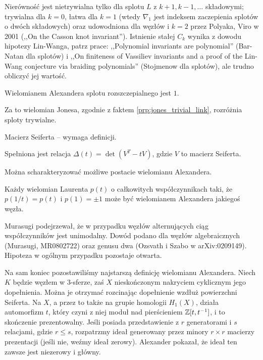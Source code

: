 Nierówność jest nietrywialna tylko dla splotu $L$ z $k+1, k-1, \ldots$ składowymi; trywialna dla $k = 0$, łatwa dla $k=1$ (wtedy $\nabla_1$ jest indeksem zaczepienia splotów o dwóch składowych) oraz udowodniona dla węzłów i $k=2$ przez Polyaka, Viro w 2001 (,,On the Casson knot invariant'').
Istnienie stałej $C_k$ wynika z dowodu hipotezy Lin-Wanga, patrz prace:
,,Polynomial invariants are polynomial'' (Bar-Natan dla splotów) i ,,On finiteness of Vassiliev invariants and a proof of the Lin-Wang conjecture via braiding polynomials'' (Stojmenow dla splotów), ale trudno obliczyć jej wartość.


\begin{proposition}
	Wielomianem Alexandera splotu rozszczepialnego jest $1$.
\end{proposition}

Za to wielomian Jonesa, zgodnie z faktem \ref{prp:jones_trivial_link}, rozróżnia sploty trywialne.

Macierz Seiferta -- wymaga definicji.
\begin{proposition}
	Spełniona jest relacja $\Delta(t)=\det(V^T-tV)$, gdzie $V$ to macierz Seiferta.
\end{proposition}

Można scharakteryzować możliwe postacie wielomianu Alexandera.

\begin{proposition}[Hosokowa, 1958]
	Każdy wielomian Laurenta $p(t)$ o całkowitych współczynnikach taki, że $p(1/t) = p(t)$ i $p(1) = \pm 1$ może być wielomianem Alexandera jakiegoś węzła.
\end{proposition}

Murasugi podejrzewał, że w przypadku węzłów alternujących ciąg współczynników jest unimodalny.
Dowód podano dla węzłów algebraicznych (Murasugi, MR0802722) oraz genusu dwa (Ozsvath i Szabo w arXiv:0209149).
Hipoteza w ogólnym przypadku pozostaje otwarta.


Na sam koniec pozostawiliśmy najstarszą definicję wielomianu Alexandera.
Niech $K$ będzie węzłem w 3-sferze, zaś $X$ nieskończonym nakryciem cyklicznym jego dopełnienia.
Można je otrzymać rozcinając dopełnienie wzdłuż powierzchni Seiferta.
Na $X$, a przez to także na grupie homologii $H_1(X)$, działa automorfizm $t$, który czyni z niej moduł nad pierścieniem $\mathbb Z[t, t^{-1}]$, i to skończenie prezentowalny.
Jeśli posiada przedstawienie z $r$ generatorami i $s$ relacjami, gdzie $r \le s$, rozpatrzmy ideał generowany przez minory $r \times r$ macierzy prezentacji (jeśli nie, weźmy ideał zerowy).
Alexander pokazał, że ideał ten zawsze jest niezerowy i główny.

